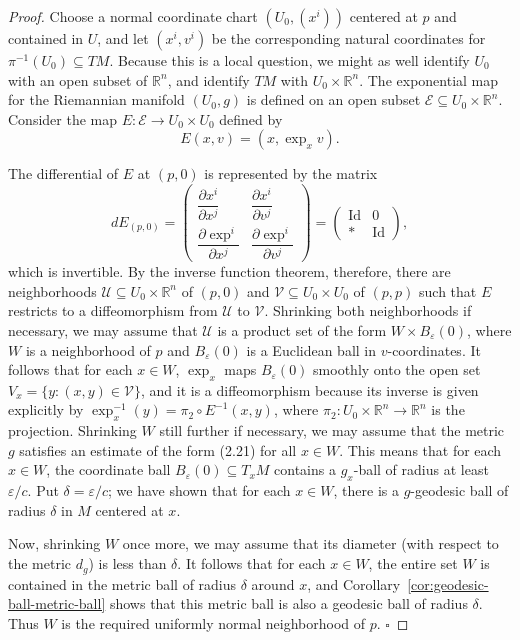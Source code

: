 \begin{proof}
Choose a normal coordinate chart $(U_0, (x^i))$ centered at $p$ and contained in $U$, and let $(x^i, v^i)$ be the corresponding natural coordinates for $\pi^{-1}(U_0) \subseteq TM$. Because this is a local question, we might as well identify $U_0$ with an open subset of $\mathbb{R}^n$, and identify $TM$ with $U_0 \times \mathbb{R}^n$. The exponential map for the Riemannian manifold $(U_0,g)$ is defined on an open subset $\mathcal{E} \subseteq U_0 \times \mathbb{R}^n$. Consider the map $E : \mathcal{E} \to U_0 \times U_0$ defined by
\[
E(x,v) = (x,\exp_x v).
\]

The differential of $E$ at $(p,0)$ is represented by the matrix
\[
dE_{(p,0)} = \begin{pmatrix}
\dfrac{\partial x^i}{\partial x^j} & \dfrac{\partial x^i}{\partial v^j} \\
\dfrac{\partial \exp^i}{\partial x^j} & \dfrac{\partial \exp^i}{\partial v^j}
\end{pmatrix} = \begin{pmatrix}
\text{Id} & 0 \\
* & \text{Id}
\end{pmatrix},
\]
which is invertible. By the inverse function theorem, therefore, there are neighborhoods $\mathcal{U} \subseteq U_0 \times \mathbb{R}^n$ of $(p,0)$ and $\mathcal{V} \subseteq U_0 \times U_0$ of $(p,p)$ such that $E$ restricts to a diffeomorphism from $\mathcal{U}$ to $\mathcal{V}$. Shrinking both neighborhoods if necessary, we may assume that $\mathcal{U}$ is a product set of the form $W \times B_\varepsilon(0)$, where $W$ is a neighborhood of $p$ and $B_\varepsilon(0)$ is a Euclidean ball in $v$-coordinates. It follows that for each $x \in W$, $\exp_x$ maps $B_\varepsilon(0)$ smoothly onto the open set $V_x = \{y : (x,y) \in \mathcal{V}\}$, and it is a diffeomorphism because its inverse is given explicitly by $\exp_x^{-1}(y) = \pi_2 \circ E^{-1}(x,y)$, where $\pi_2 : U_0 \times \mathbb{R}^n \to \mathbb{R}^n$ is the projection. Shrinking $W$ still further if necessary, we may assume that the metric $g$ satisfies an estimate of the form (2.21) for all $x \in W$. This means that for each $x \in W$, the coordinate ball $B_\varepsilon(0) \subseteq T_x M$ contains a $g_x$-ball of radius at least $\varepsilon/c$. Put $\delta = \varepsilon/c$; we have shown that for each $x \in W$, there is a $g$-geodesic ball of radius $\delta$ in $M$ centered at $x$.


Now, shrinking $W$ once more, we may assume that its diameter (with respect to the metric $d_g$) is less than $\delta$. It follows that for each $x \in W$, the entire set $W$ is contained in the metric ball of radius $\delta$ around $x$, and Corollary~\ref{cor:geodesic-ball-metric-ball} shows that this metric ball is also a geodesic ball of radius $\delta$. Thus $W$ is the required uniformly normal neighborhood of $p$. $\square$
\end{proof}

